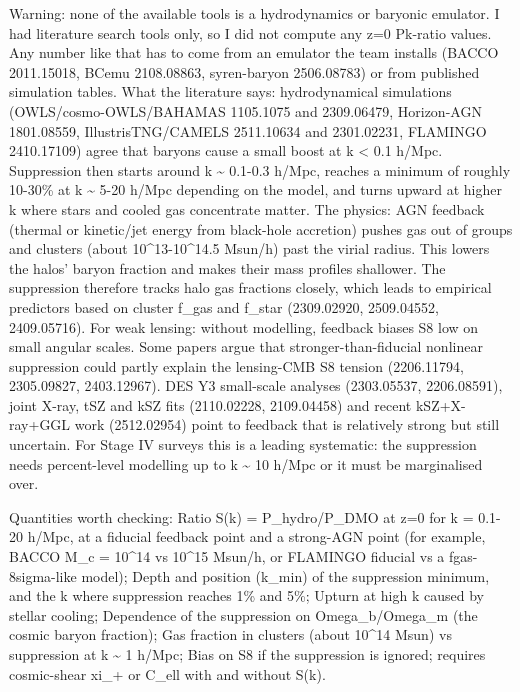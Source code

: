 \documentclass[11pt,a4paper]{article}
\begin{document}
Warning: none of the available tools is a hydrodynamics or baryonic emulator. I had literature search tools only, so I did not compute any z=0 Pk-ratio values. Any number like that has to come from an emulator the team installs (BACCO 2011.15018, BCemu 2108.08863, syren-baryon 2506.08783) or from published simulation tables. What the literature says: hydrodynamical simulations (OWLS/cosmo-OWLS/BAHAMAS 1105.1075 and 2309.06479, Horizon-AGN 1801.08559, IllustrisTNG/CAMELS 2511.10634 and 2301.02231, FLAMINGO 2410.17109) agree that baryons cause a small boost at k \textless{} 0.1 h/Mpc. Suppression then starts around k \textasciitilde{} 0.1-0.3 h/Mpc, reaches a minimum of roughly 10-30\% at k \textasciitilde{} 5-20 h/Mpc depending on the model, and turns upward at higher k where stars and cooled gas concentrate matter. The physics: AGN feedback (thermal or kinetic/jet energy from black-hole accretion) pushes gas out of groups and clusters (about 10\textasciicircum{}13-10\textasciicircum{}14.5 Msun/h) past the virial radius. This lowers the halos' baryon fraction and makes their mass profiles shallower. The suppression therefore tracks halo gas fractions closely, which leads to empirical predictors based on cluster f\_gas and f\_star (2309.02920, 2509.04552, 2409.05716). For weak lensing: without modelling, feedback biases S8 low on small angular scales. Some papers argue that stronger-than-fiducial nonlinear suppression could partly explain the lensing-CMB S8 tension (2206.11794, 2305.09827, 2403.12967). DES Y3 small-scale analyses (2303.05537, 2206.08591), joint X-ray, tSZ and kSZ fits (2110.02228, 2109.04458) and recent kSZ+X-ray+GGL work (2512.02954) point to feedback that is relatively strong but still uncertain. For Stage IV surveys this is a leading systematic: the suppression needs percent-level modelling up to k \textasciitilde{} 10 h/Mpc or it must be marginalised over.

Quantities worth checking: Ratio S(k) = P\_hydro/P\_DMO at z=0 for k = 0.1-20 h/Mpc, at a fiducial feedback point and a strong-AGN point (for example, BACCO M\_c = 10\textasciicircum{}14 vs 10\textasciicircum{}15 Msun/h, or FLAMINGO fiducial vs a fgas-8sigma-like model); Depth and position (k\_min) of the suppression minimum, and the k where suppression reaches 1\% and 5\%; Upturn at high k caused by stellar cooling; Dependence of the suppression on Omega\_b/Omega\_m (the cosmic baryon fraction); Gas fraction in clusters (about 10\textasciicircum{}14 Msun) vs suppression at k \textasciitilde{} 1 h/Mpc; Bias on S8 if the suppression is ignored; requires cosmic-shear xi\_+ or C\_ell with and without S(k).
\end{document}
